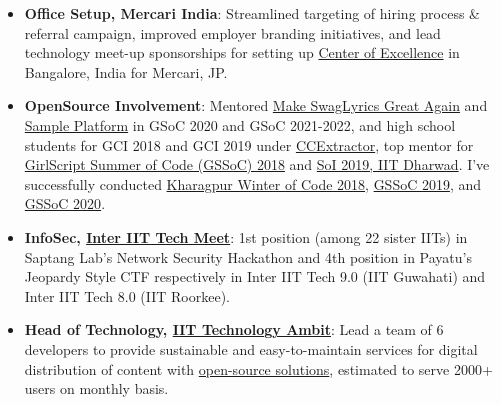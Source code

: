 \documentclass[a4paper,10pt]{extarticle} %
\begin{document}
\begin{itemize}[leftmargin=0.55cm, rightmargin=0.2cm, label={\Large\textbullet}]

\item \textbf{Office Setup, Mercari India}: Streamlined targeting of hiring process \& referral campaign, improved employer branding initiatives, and lead technology meet-up sponsorships for setting up \href{https://about.mercari.com/en/press/news/articles/20220511_indiacenterofexcellence/}{Center of Excellence} in Bangalore, India for Mercari, JP.

\item \textbf{OpenSource Involvement}: Mentored \href{https://summerofcode.withgoogle.com/projects/#6058060717490176}{Make SwagLyrics Great Again} and \href{https://summerofcode.withgoogle.com/projects/#6707916582682624}{Sample Platform} in GSoC 2020 and GSoC 2021-2022, and  high school students for GCI 2018 and GCI 2019 under \href{https://codein.withgoogle.com/organizations/ccextractor-development/}{CCExtractor}, top mentor for \href{https://www.gssoc.tech/}{GirlScript Summer of Code (GSSoC) 2018} and \href{https://oss2019.github.io/SoI.html}{SoI 2019, IIT Dharwad}. I've successfully conducted
\href{https://kwoc.kossiitkgp.org/}{Kharagpur Winter of Code 2018}, \href{https://gssoc.tech/}{GSSoC 2019}, and \href{https://gssoc.tech/}{GSSoC 2020}.

\item\textbf{InfoSec, \href{https://wiki.metakgp.org/w/Inter_IIT_Tech_Meet}{Inter IIT Tech Meet}}: 1st position (among 22 sister IITs) in Saptang Lab's Network Security Hackathon and 4th position in Payatu's Jeopardy Style CTF respectively in Inter IIT Tech 9.0 (IIT Guwahati) and Inter IIT Tech 8.0 (IIT Roorkee).

\item\textbf{Head of Technology, {\href{https://iit-techambit.in}{IIT Technology Ambit}}}: Lead a team of 6 developers to provide sustainable and easy-to-maintain services for digital distribution of content with {\href{https://github.com/iit-technology-ambit/}{open-source solutions}}, estimated to serve 2000+ users on monthly basis.



\end{itemize}
\end{document}
